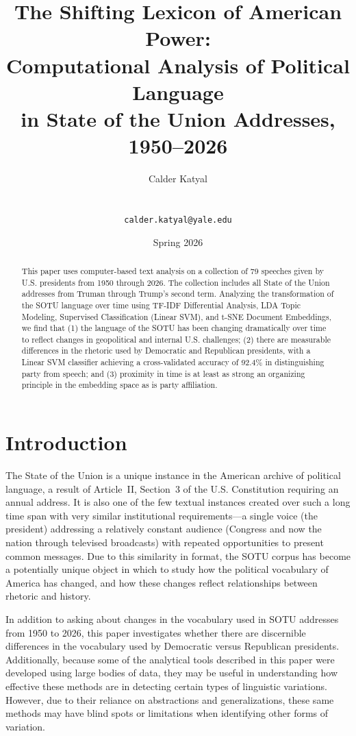 \documentclass[11pt,twocolumn]{article}
\title{\textbf{The Shifting Lexicon of American Power:\\Computational Analysis of Political Language\\in State of the Union Addresses, 1950--2026}}
\author{Calder Katyal\\
\text{Yale University}\\
\text{HUMS 3210 (Culture as Data: Thinking Computationally with Text)}\\
\texttt{calder.katyal@yale.edu}}
\date{Spring 2026}
\begin{document}
\maketitle

\begin{abstract}
\noindent This paper uses computer-based text analysis on a collection of 79 speeches given by U.S. presidents from 1950 through 2026. The collection includes all State of the Union addresses from Truman through Trump's second term. Analyzing the transformation of the SOTU language over time using TF-IDF Differential Analysis, LDA Topic Modeling, Supervised Classification (Linear SVM), and t-SNE Document Embeddings, we find that (1) the language of the SOTU has been changing dramatically over time to reflect changes in geopolitical and internal U.S. challenges; (2) there are measurable differences in the rhetoric used by Democratic and Republican presidents, with a Linear SVM classifier achieving a cross-validated accuracy of 92.4\% in distinguishing party from speech; and (3) proximity in time is at least as strong an organizing principle in the embedding space as is party affiliation.
\end{abstract}

\section{Introduction}

The State of the Union is a unique instance in the American archive of political language, a result of Article~II, Section~3 of the U.S. Constitution requiring an annual address. It is also one of the few textual instances created over such a long time span with very similar institutional requirements---a single voice (the president) addressing a relatively constant audience (Congress and now the nation through televised broadcasts) with repeated opportunities to present common messages. Due to this similarity in format, the SOTU corpus has become a potentially unique object in which to study how the political vocabulary of America has changed, and how these changes reflect relationships between rhetoric and history.

In addition to asking about changes in the vocabulary used in SOTU addresses from 1950 to 2026, this paper investigates whether there are discernible differences in the vocabulary used by Democratic versus Republican presidents. Additionally, because some of the analytical tools described in this paper were developed using large bodies of data, they may be useful in understanding how effective these methods are in detecting certain types of linguistic variations. However, due to their reliance on abstractions and generalizations, these same methods may have blind spots or limitations when identifying other forms of variation.
\end{document}
